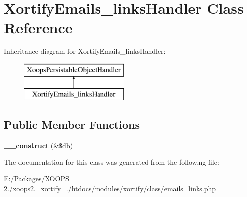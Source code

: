 \hypertarget{class_xortify_emails__links_handler}{\section{Xortify\-Emails\-\_\-links\-Handler Class Reference}
\label{class_xortify_emails__links_handler}
}
Inheritance diagram for Xortify\-Emails\-\_\-links\-Handler\-:\begin{figure}[H]
\begin{center}
\leavevmode
\includegraphics[height=2.000000cm]{class_xortify_emails__links_handler}
\end{center}
\end{figure}
\subsection*{Public Member Functions}
\begin{DoxyCompactItemize}
\item 
\hypertarget{class_xortify_emails__links_handler_a99d724c32072c717f8d0dd2158b93ea0}{{\bfseries \-\_\-\-\_\-construct} (\&\$db)}\label{class_xortify_emails__links_handler_a99d724c32072c717f8d0dd2158b93ea0}

\end{DoxyCompactItemize}


The documentation for this class was generated from the following file\-:\begin{DoxyCompactItemize}
\item 
E\-:/\-Packages/\-X\-O\-O\-P\-S 2./xoops2.\-\_\-xortify\-\_./htdocs/modules/xortify/class/emails\-\_\-links.\-php\end{DoxyCompactItemize}
